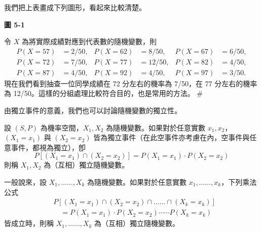 \begin{discussion}
我們把上表畫成下列圖形，看起來比較清楚。

\begin{center}

\vspace{0.3em}
\textbf{圖 5-1}
\end{center}

令 $X$ 為將實際成績對應到代表數的隨機變數，則
\begin{align*}
P(X = 57) &= 2/50, & P(X = 62) &= 8/50, & P(X = 67) &= 6/50, \\
P(X = 72) &= 7/50, & P(X = 77) &= 12/50, & P(X = 82) &= 4/50, \\
P(X = 87) &= 4/50, & P(X = 92) &= 4/50, & P(X = 97) &= 3/50.
\end{align*}
現在我們看到抽查一位同學成績在 72 分左右的機率為 7/50，在 77 分左右的機率為 12/50。這樣的分組處理比較符合目的，也是常用的方法。 \hfill $\#$
\end{discussion}

由獨立事件的意義，我們也可以討論隨機變數的獨立性。

\medskip
\begin{definition*}
設 $(S, P)$ 為機率空間，$X_1, X_2$ 為隨機變數。如果對於任意實數 $x_1, x_2$，$(X_1 = x_1)$ 與 $(X_2 = x_2)$ 皆為獨立事件（在此空事件亦考慮在內，空事件與任意事件，都視為獨立），卽
\[
P[(X_1 = x_1) \cap (X_2 = x_2)] = P(X_1 = x_1) \cdot P(X_2 = x_2)
\]
則稱 $X_1, X_2$ 為（互相）獨立隨機變數。

一般說來，設 $X_1, \dots\dots, X_k$ 為隨機變數。如果對於任意實數 $x_1, \dots\dots, x_k$，下列乘法公式
\begin{align*}
&P[(X_1 = x_1) \cap (X_2 = x_2) \cap \dots\dots \cap (X_k = x_k)] \\
&\quad = P(X_1 = x_1) \cdot P(X_2 = x_2) \cdots\cdots P(X_k = x_k)
\end{align*}
皆成立時，則稱 $X_1, \dots\dots, X_k$ 為（互相）獨立隨機變數。
\end{definition*}

